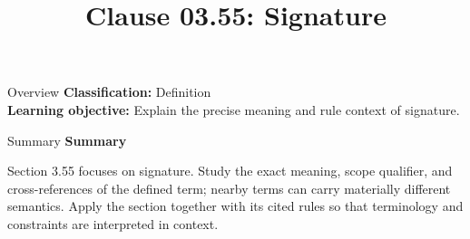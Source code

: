 \documentclass[10pt,letterpaper]{article}
\title{Clause 03.55: Signature}
\author{}
\date{}
\begin{document}
\maketitle
\begin{CornellOverviewBox}{Overview}
\textbf{Classification:} Definition\\[2pt]
\textbf{Learning objective:} Explain the precise meaning and rule context of signature.
\end{CornellOverviewBox}\begin{CornellSummaryBox}{Summary}
{\sffamily\bfseries\color{Accent} Summary}\par\vspace{3pt}Section 3.55 focuses on signature. Study the exact meaning, scope qualifier, and cross-references of the defined term; nearby terms can carry materially different semantics. Apply the section together with its cited rules so that terminology and constraints are interpreted in context.
\end{CornellSummaryBox}
\end{document}
